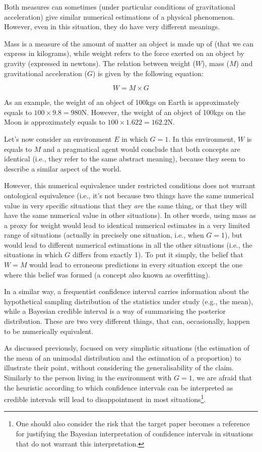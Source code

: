 \documentclass[a4paper,man,natbib,floatsintext,donotrepeattitle]{apa6}
\begin{document}
Both measures can sometimes (under particular conditions of gravitational acceleration) give similar numerical estimations of a physical phenomenon. However, even in this situation, they do have very different meanings.

Mass is a measure of the amount of matter an object is made up of (that we can express in kilograms), while weight refers to the force exerted on an object by gravity (expressed in newtons). The relation between weight ($W$), mass ($M$) and gravitational acceleration ($G$) is given by the following equation:

$$ W = M \times G $$

As an example, the weight of an object of 100kgs on Earth is approximately equals to $100 \times 9.8 = 980 \text{N}$. However, the weight of an object of 100kgs on the Moon is approximately equals to $100 \times 1.622 = 162.2\text{N}$.

Let's now consider an environment $E$ in which $G = 1$. In this environment, $W$ is equals to $M$ and a pragmatical agent would conclude that both concepts are identical (i.e., they refer to the same abstract meaning), because they seem to describe a similar aspect of the world.

However, this numerical equivalence under restricted conditions does not warrant ontological equivalence (i.e., it's not because two things have the same numerical value in very specific situations that they \textit{are} the same thing, or that they will have the same numerical value in other situations). In other words, using mass as a proxy for weight would lead to identical numerical estimates in a very limited range of situations (actually in precisely one situation, i.e., when $G = 1$), but would lead to different numerical estimations in all the other situations (i.e., the situations in which $G$ differs from exactly 1). To put it simply, the belief that $W = M$ would lead to erroneous predictions in every situation except the one where this belief was formed (a concept also known as overfitting).

In a similar way, a frequentist confidence interval carries information about the hypothetical sampling distribution of the statistics under study (e.g., the mean), while a Bayesian credible interval is a way of summarising the posterior distribution. These are two very different things, that can, occasionally, happen to be numerically equivalent.

As discussed previously, \cite{albers_credible_2018} focused on very simplistic situations (the estimation of the mean of an unimodal distribution and the estimation of a proportion) to illustrate their point, without considering the generalisability of the claim. Similarly to the person living in the environment with $G = 1$, we are afraid that the heuristic according to which confidence intervals can be interpreted as credible intervals will lead to disappointment in most situations\footnote{One should also consider the risk that the target paper becomes a reference for justifying the Bayesian interpretation of confidence intervals in situations that do not warrant this interpretation.}.
\end{document}
